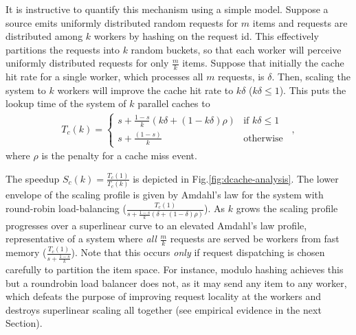 It is instructive to quantify this mechanism using a simple model. Suppose a source emits uniformly distributed random requests for $m$ items and requests are distributed among $k$ workers by hashing on the request id. This effectively partitions the requests into $k$ random buckets, so that each worker will perceive uniformly distributed requests for only $\frac{m}{k}$ items.  Suppose that initially the cache hit rate for a single worker, which processes all $m$ requests, is $\delta$. Then, scaling the system to $k$ workers will improve the cache hit rate to $k\delta$ ($k\delta \le 1$). This puts the lookup time of the system of $k$ parallel caches to
\begin{align}\label{eq:dist-cache}
  T_c(k) = \begin{cases} s + \frac{1-s}{k}(k\delta + (1-k\delta)\rho) & \text{if } k\delta \le 1\\s + \frac{(1-s)}{k} & \text{otherwise}\end{cases} \enspace ,
\end{align}
where $\rho$ is the penalty for a cache miss event.

The speedup $S_c(k)=\frac{T_c(1)}{T_c(k)}$ is depicted in Fig.\ref{fig:dcache-analysis}. The lower envelope of the scaling profile is given by Amdahl's law for the system with round-robin load-balancing ($\frac{T_c(1)}{s + \frac{1-s}{k}(\delta + (1-\delta)\rho)}$). As $k$ grows the scaling profile progresses over a superlinear curve to an elevated Amdahl's law profile, representative of a system where \emph{all} $\frac{m}{k}$ requests are served be workers from fast memory ($\frac{T_c(1)}{s + \frac{1-s}{k}}$). Note that this occurs \emph{only} if request dispatching is chosen carefully to partition the item space. For instance, modulo hashing achieves this but a roundrobin load balancer does not, as it may send any item to any worker, which defeats the purpose of improving request locality at the workers and destroys superlinear scaling all together  (see empirical evidence in the next Section).



